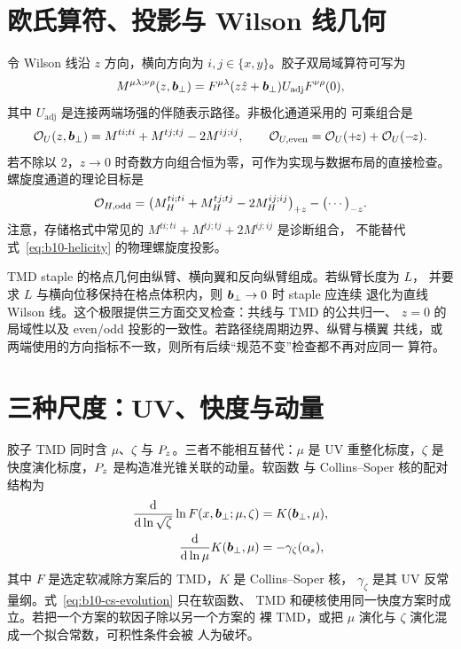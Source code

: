 \section{欧氏算符、投影与 Wilson 线几何}

令 Wilson 线沿 $z$ 方向，横向方向为 $i,j\in\{x,y\}$。胶子双局域算符可写为
\begin{equation}
  M^{\mu\lambda;\nu\rho}(z,\boldsymbol b_\perp)
  =F^{\mu\lambda}(z\hat z+\boldsymbol b_\perp)U_{\mathrm{adj}}
  F^{\nu\rho}(0),
  \label{eq:b10-bilocal}
\end{equation}
其中 $U_{\mathrm{adj}}$ 是连接两端场强的伴随表示路径。非极化通道采用的
可乘组合是
\begin{equation}
  \mathcal O_U(z,\boldsymbol b_\perp)
  =M^{ti;ti}+M^{tj;tj}-2M^{ij;ij},
  \qquad
  \mathcal O_{U,\mathrm{even}}=\mathcal O_U(+\!z)+\mathcal O_U(-\!z).
  \label{eq:b10-unpolarized}
\end{equation}
若不除以 2，$z\to0$ 时奇数方向组合恒为零，可作为实现与数据布局的直接检查。
螺旋度通道的理论目标是
\begin{equation}
  \mathcal O_{H,\mathrm{odd}}
  =\bigl(M^{ti;ti}_H+M^{tj;tj}_H-2M^{ij;ij}_H\bigr)_{+z}
  -\bigl(\cdots\bigr)_{-z}.
  \label{eq:b10-helicity}
\end{equation}
注意，存储格式中常见的 $M^{ti;ti}+M^{tj;tj}+2M^{ij;ij}$ 是诊断组合，
不能替代式~\eqref{eq:b10-helicity} 的物理螺旋度投影。

TMD staple 的格点几何由纵臂、横向翼和反向纵臂组成。若纵臂长度为 $L$，
并要求 $L$ 与横向位移保持在格点体积内，则 $\boldsymbol b_\perp\to0$ 时 staple 应连续
退化为直线 Wilson 线。这个极限提供三方面交叉检查：共线与 TMD 的公共归一、
$z=0$ 的局域性以及 even/odd 投影的一致性。若路径绕周期边界、纵臂与横翼
共线，或两端使用的方向指标不一致，则所有后续“规范不变”检查都不再对应同一
算符。

\section{三种尺度：UV、快度与动量}

胶子 TMD 同时含 $\mu$、$\zeta$ 与 $P_z$。三者不能相互替代：$\mu$ 是 UV
重整化标度，$\zeta$ 是快度演化标度，$P_z$ 是构造准光锥关联的动量。软函数
与 Collins--Soper 核的配对结构为
\begin{align}
  \frac{\mathrm{d}}{\mathrm{d}\ln\sqrt{\zeta}}\ln F(x,\boldsymbol b_\perp;\mu,\zeta)
  &=K(\boldsymbol b_\perp,\mu),
  \label{eq:b10-cs-evolution}\\
  \frac{\mathrm{d}}{\mathrm{d}\ln\mu}K(\boldsymbol b_\perp,\mu)
  &=-\gamma_\zeta(\alpha_s),
  \label{eq:b10-cs-mu}
\end{align}
其中 $F$ 是选定软减除方案后的 TMD，$K$ 是 Collins--Soper 核，
$\gamma_\zeta$ 是其 UV 反常量纲。式~\eqref{eq:b10-cs-evolution} 只在软函数、
TMD 和硬核使用同一快度方案时成立。若把一个方案的软因子除以另一个方案的
裸 TMD，或把 $\mu$ 演化与 $\zeta$ 演化混成一个拟合常数，可积性条件会被
人为破坏。

